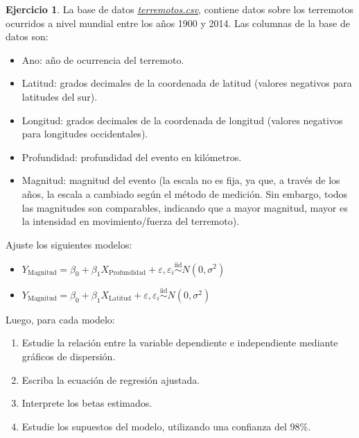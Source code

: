 \documentclass[
  11pt,
]{book}
\providecommand{\tightlist}{%
  \setlength{\itemsep}{0pt}\setlength{\parskip}{0pt}}
\theoremstyle{definition}
\theoremstyle{definition}
\theoremstyle{definition}
\newtheorem{exercise}{Ejercicio}[chapter]
\theoremstyle{definition}
\theoremstyle{remark}
\begin{document}
\begin{exercise}

La base de datos \href{https://raw.githubusercontent.com/Dfranzani/Bases-de-datos-para-cursos/main/2022-2/Estad\%C3\%ADstica\%202/terremotos.csv}{\emph{terremotos.csv}}, contiene datos sobre los terremotos ocurridos a nivel mundial entre los años 1900 y 2014. Las columnas de la base de datos son:

\begin{itemize}
\tightlist
\item
  Ano: año de ocurrencia del terremoto.
\item
  Latitud: grados decimales de la coordenada de latitud (valores negativos para latitudes del sur).
\item
  Longitud: grados decimales de la coordenada de longitud (valores negativos para longitudes occidentales).
\item
  Profundidad: profundidad del evento en kilómetros.
\item
  Magnitud: magnitud del evento (la escala no es fija, ya que, a través de los años, la escala a cambiado según el método de medición. Sin embargo, todos las magnitudes son comparables, indicando que a mayor magnitud, mayor es la intensidad en movimiento/fuerza del terremoto).
\end{itemize}

Ajuste los siguientes modelos:

\begin{itemize}
\item
  \(Y_{\text{Magnitud}} = \beta_0 + \beta_1X_{\text{Profundidad}} + \varepsilon, \varepsilon_i \overset{\text{iid}}{\sim} N(0,\sigma^2)\)
\item
  \(Y_{\text{Magnitud}} = \beta_0 + \beta_1X_{\text{Latitud}} + \varepsilon, \varepsilon_i \overset{\text{iid}}{\sim} N(0,\sigma^2)\)
\end{itemize}

Luego, para cada modelo:

\begin{enumerate}
\def\labelenumi{\arabic{enumi}.}
\tightlist
\item
  Estudie la relación entre la variable dependiente e independiente mediante gráficos de dispersión.
\item
  Escriba la ecuación de regresión ajustada.
\item
  Interprete los betas estimados.
\item
  Estudie los supuestos del modelo, utilizando una confianza del 98\%.
\end{enumerate}

\end{exercise}
\end{document}
